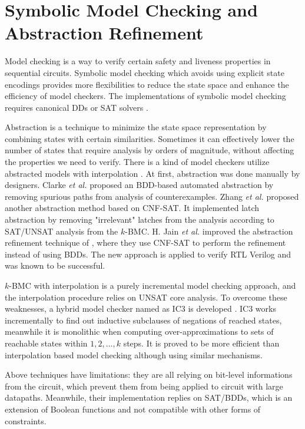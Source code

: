 \section{Symbolic Model Checking and Abstraction Refinement}
Model checking is a way to verify certain safety and liveness properties 
in sequential circuits. Symbolic model checking which avoids using explicit state encodings
provides more flexibilities to reduce the state space and enhance the 
efficiency of model checkers. The implementations of symbolic model checking 
requires canonical DDs or SAT solvers \cite{burch1990sequential,burch1991representing,biere1999symbolic,biere1999symbolic}.

Abstraction is a technique to minimize the state space representation by combining states with certain 
similarities. Sometimes it can effectively lower the number of states that require analysis by orders of magnitude,
without affecting the properties we need to verify. There is a kind of model checkers utilize abstracted models 
with interpolation \cite{mcmillan2003interpolation,mcmillan:cav06}.
At first, abstraction was done manually by designers. Clarke {\it et al.} \cite{clarke2000counterexample}
proposed an BDD-based automated abstraction by removing spurious paths from analysis of counterexamples. 
Zhang {\it et al.} \cite{zhang2005design} proposed another abstraction method based on CNF-SAT.
It implemented latch abstraction by removing "irrelevant" latches from the analysis
according to SAT/UNSAT analysis from the $k$-BMC. H. Jain {\it et al.} \cite{HimanshuDAC2005} improved the abstraction refinement technique of \cite{clarke2000counterexample},
where they use CNF-SAT to perform the refinement instead of using BDDs. The new approach is applied to verify RTL Verilog
and was known to be successful.

$k$-BMC with interpolation is a purely incremental model checking approach, and the interpolation procedure relies
on UNSAT core analysis. To overcome these weaknesses, a hybrid model checker named as IC3 is developed 
\cite{bradley2011sat} \cite{bradley2011incremental}. IC3 works incrementally to find out inductive subclauses
of negations of reached states, meanwhile it is monolithic when computing over-approximations to sets of reachable
states within $1,2,\dots,k$ steps. It is proved to be more efficient than interpolation based model checking
although using similar mechanisms.

Above techniques have limitations: they are all relying on bit-level informations from 
the circuit, which prevent them from being applied to circuit with large datapaths.
Meanwhile, their implementation replies on SAT/BDDs, which is an extension of Boolean 
functions and not compatible with other forms of constraints.

